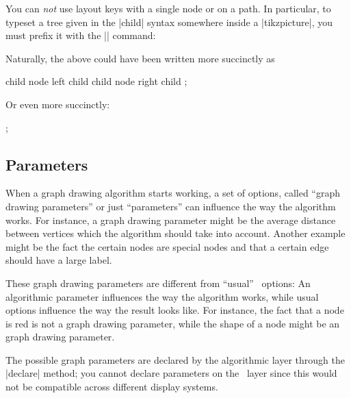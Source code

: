 \begin{command}{\pgfgdsetrequestcallback{}}
    You can \emph{not} use layout keys with a single node or on a path. In
    particular, to typeset a tree given in the |child| syntax somewhere inside
    a |{tikzpicture}|, you must prefix it with the |\scoped| command:
\begin{codeexample}[preamble={\usetikzlibrary{graphdrawing}
\usegdlibrary{trees}}]
\end{codeexample}
    Naturally, the above could have been written more succinctly as
\begin{codeexample}[preamble={\usetikzlibrary{graphdrawing}
\usegdlibrary{trees}}]
  child { node {left child} }
  child { node {right child} };
\end{codeexample}
    Or even more succinctly:
\begin{codeexample}[preamble={\usetikzlibrary{graphs,graphdrawing}
\usegdlibrary{trees}}]
\tikz {};
\end{codeexample}
\end{command}


\subsection{Parameters}
\label{section-gd-parameters}

When a graph drawing algorithm starts working, a set of options, called ``graph
drawing parameters'' or just ``parameters'' can influence the way the algorithm
works. For instance, a graph drawing parameter might be the average distance
between vertices which the algorithm should take into account. Another example
might be the fact the certain nodes are special nodes and that a certain edge
should have a large label.

These graph drawing parameters are different from ``usual'' \pgfname\ options:
An algorithmic parameter influences the way the algorithm works, while usual
options influence the way the result looks like. For instance, the fact that a
node is red is not a graph drawing parameter, while the shape of a node might
be an graph drawing parameter.

The possible graph parameters are declared by the algorithmic layer through the
|declare| method; you cannot declare parameters on the \pgfname\ layer since
this would not be compatible across different display systems.


